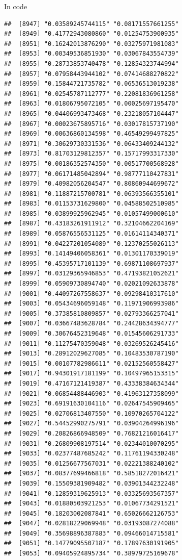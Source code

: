 \documentclass[ignorenonframetext,]{beamer}
\begin{document}
\begin{frame}[fragile]{In code}
\begin{verbatim}
##  [8947] "0.03589245744115" "0.08171557661255"
##  [8949] "0.41772943080860" "0.01254753900935"
##  [8951] "0.16242013876290" "0.03275971981083"
##  [8953] "0.00349536851930" "0.03067843554739"
##  [8955] "0.28733853740478" "0.12854323744994"
##  [8957] "0.07958443944102" "0.07414688270822"
##  [8959] "0.15844721735782" "0.06536513019238"
##  [8961] "0.02545787112777" "0.22081836961258"
##  [8963] "0.01806795072105" "0.00025697195470"
##  [8965] "0.04406993473468" "0.23218057104447"
##  [8967] "0.00023675895716" "0.03017815737190"
##  [8969] "0.00636860134598" "0.46549299497825"
##  [8971] "0.30629730331536" "0.06433409244132"
##  [8973] "0.81703129812357" "0.15717993317330"
##  [8975] "0.00186352574350" "0.00517700568928"
##  [8977] "0.06171485042894" "0.98777110427831"
##  [8979] "0.40982056204547" "0.80860944699672"
##  [8981] "0.11887215700781" "0.06393566355101"
##  [8983] "0.01153731629800" "0.04588502510985"
##  [8985] "0.03899925962945" "0.01057499000610"
##  [8987] "0.43183261911912" "0.32104662204169"
##  [8989] "0.05876556531125" "0.01614114340371"
##  [8991] "0.04227201054089" "0.12370255026113"
##  [8993] "0.14149406058361" "0.01301170339019"
##  [8995] "0.45395717101139" "0.69871108697937"
##  [8997] "0.03129365946853" "0.47193821052621"
##  [8999] "0.05909730894740" "0.02021092633878"
##  [9001] "0.44097267558637" "0.09298410317610"
##  [9003] "0.05434696059148" "0.11971906993986"
##  [9005] "0.37385810809857" "0.02793366257041"
##  [9007] "0.03667483628784" "0.24428634394777"
##  [9009] "0.30676452319648" "0.01545606291733"
##  [9011] "0.11275470359048" "0.03269526245416"
##  [9013] "0.28912029627085" "0.10483530787190"
##  [9015] "0.00107782986611" "0.02152560558427"
##  [9017] "0.94301917181199" "0.10497965153315"
##  [9019] "0.47167121419387" "0.43338384634344"
##  [9021] "0.06854488446903" "0.41963127358099"
##  [9023] "0.69191630104116" "0.02647545909465"
##  [9025] "0.02706813407550" "0.10970265704122"
##  [9027] "0.54452990275791" "0.03904264996196"
##  [9029] "0.20826866948509" "0.76821216016417"
##  [9031] "0.26809908197514" "0.02344010070295"
##  [9033] "0.02377487685242" "0.11761194330248"
##  [9035] "0.01256677567031" "0.02221388240102"
##  [9037] "0.08377699466818" "0.58518272016421"
##  [9039] "0.15509381909482" "0.03901344232248"
##  [9041] "0.12859319625913" "0.03325693567357"
##  [9043] "0.01880503921253" "0.01067734291521"
##  [9045] "0.18203002087841" "0.65026662126753"
##  [9047] "0.02818229069948" "0.03193087274088"
##  [9049] "0.35698896387883" "0.09466014715581"
##  [9051] "0.14779095507187" "0.17897630191905"
##  [9053] "0.09405924895734" "0.38979725169678"

\end{verbatim}
\end{frame}
\end{document}
